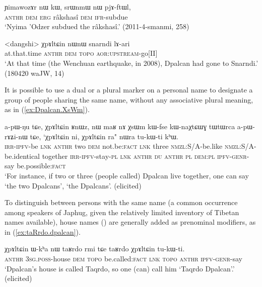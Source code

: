 \begin{exe}
\ex \label{ex:Yimawodzer.NW}
 \gll  ɲimawozɤr nɯ kɯ, srɯnmɯ nɯ pjɤ-ftɯl, \\
  \textsc{anthr} \textsc{dem} \textsc{erg} râkshasî \textsc{dem} \textsc{ifr}-subdue \\
 \glt `Nyima 'Odzer subdued the râkshasî.' (2011-4-smanmi, 258)
\end{exe}

\begin{exe}
	\ex \label{ex:XpAltCin.nWnW}
	\gll <dangshi> χpɤltɕin nɯnɯ snarndi lɤ-ari \\
	at.that.time  \textsc{anthr} \textsc{dem}  \textsc{topo} \textsc{aor}:\textsc{upstream}-go[II] \\
	\glt `At that time (the Wenchuan earthquake, in 2008), Dpalcan had gone to Snarndi.' (180420 waJW, 14)
\end{exe}

It is possible to use a dual or a plural marker on a personal name to designate a group of people sharing the same name, without any associative plural meaning, as in (\ref{ex:Dpalcan.XsWm}).

\begin{exe}
\ex \label{ex:Dpalcan.XsWm}
 \gll a-pɯ-ŋu tɕe, χpɤltɕin ʁnɯz, nɯ maʁ nɤ χsɯm kɯ-fse kɯ-naχtɕɯɣ tɯtɯrca a-pɯ-rɤʑi-nɯ tɕe, `χpɤltɕin ni, χpɤltɕin ra" nɯra tu-kɯ-ti kʰɯ. \\
 \textsc{irr}-\textsc{ipfv}-be \textsc{lnk}  \textsc{anthr} two \textsc{dem} not.be:\textsc{fact} \textsc{lnk} three \textsc{nmzl}:S/A-be.like \textsc{nmzl}:S/A-be.identical together \textsc{irr}-\textsc{ipfv}-stay-\textsc{pl} \textsc{lnk}  \textsc{anthr} \textsc{du}  \textsc{anthr} \textsc{pl} \textsc{dem}:\textsc{pl} \textsc{ipfv}-\textsc{genr}-say be.possible:\textsc{fact} \\ 
 \glt `For instance, if two or three (people called) Dpalcan live together, one can say `the two Dpalcans', `the Dpalcans'. (elicited)
\end{exe}

To distinguish between persons with the same name (a common occurrence among speakers of Japhug, given the relatively limited inventory of Tibetan names available), house names () are generally added as prenominal modifiers, as in (\ref{ex:taRrdo.dpalcan}).

\begin{exe}
\ex \label{ex:taRrdo.dpalcan}
\gll χpɤltɕin ɯ-kʰa nɯ taʁrdo rmi tɕe taʁrdo χpɤltɕin tu-kɯ-ti. \\
\textsc{anthr} \textsc{3sg}.\textsc{poss}-house \textsc{dem}  \textsc{topo} be.called:\textsc{fact} \textsc{lnk}  \textsc{topo}  \textsc{anthr} \textsc{ipfv}-\textsc{genr}-say \\
\glt `Dpalcan's house is called Taqrdo, so one (can) call him `Taqrdo Dpalcan'.' (elicited)
\end{exe}


